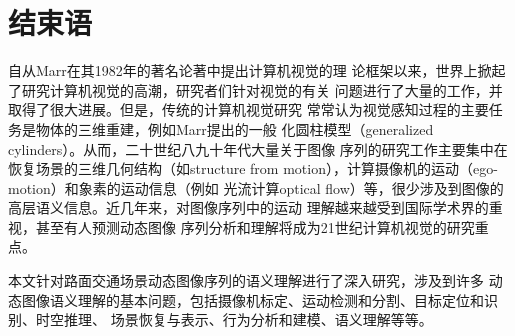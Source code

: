 \chapter{结束语}
\label{chap7}

自从Marr在其1982年的著名论著\cite{Marr:1982}中提出计算机视觉的理
论框架以来，世界上掀起了研究计算机视觉的高潮，研究者们针对视觉的有关
问题进行了大量的工作，并取得了很大进展。但是，传统的计算机视觉研究
常常认为视觉感知过程的主要任务是物体的三维重建，例如Marr提出的一般
化圆柱模型（generalized
cylinders）\cite{Marr:1982}。从而，二十世纪八九十年代大量关于图像
序列的研究工作主要集中在恢复场景的三维几何结构（如structure from
motion），计算摄像机的运动（ego-motion）和象素的运动信息（例如 光流计算optical
flow）等，很少涉及到图像的高层语义信息。近几年来，对图像序列中的运动
理解越来越受到国际学术界的重视，甚至有人预测\cite{Mubarak:2002}动态图像
序列分析和理解将成为21世纪计算机视觉的研究重点。

本文针对路面交通场景动态图像序列的语义理解进行了深入研究，涉及到许多
动态图像语义理解的基本问题，包括摄像机标定、运动检测和分割、目标定位和识别、时空推理、
场景恢复与表示、行为分析和建模、语义理解等等。
